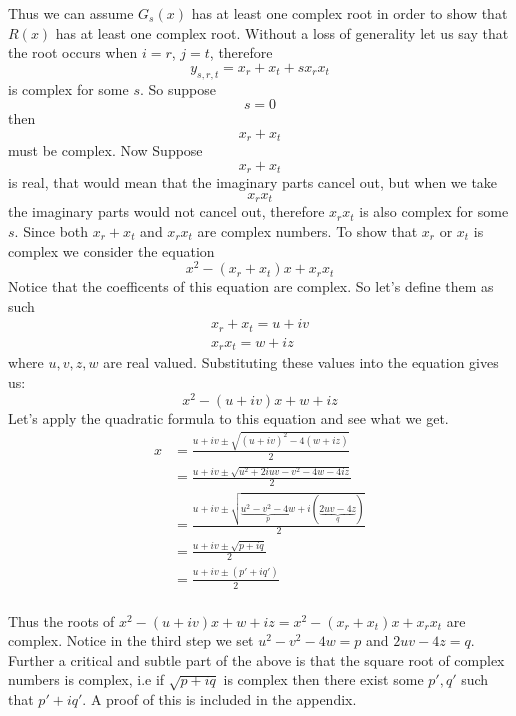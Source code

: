 \documentclass[12pt]{article}
\begin{document}
\begin{center}
\end{center}

  Thus we can assume $G_s(x)$ has at least one complex root in order to show that $R(x)$ has at least one complex root.  Without a loss of generality let us say that the root occurs when $i=r$, $j=t$, therefore 
$$y_{s,r,t} = x_r + x_t +s x_r x_t$$ 
is complex for some $s$.  So suppose 
$$s=0$$ 
then 
$$x_r + x_t$$ 
must be complex.  Now Suppose 
$$x_r + x_t$$ 
is real, that would mean that the imaginary parts cancel out, but when we take 
$$x_r x_t$$ 
the imaginary parts would not cancel out, therefore $x_r x_t$ is also complex for some $s$.  Since both $x_r+x_t$ and $x_r x_t$ are complex numbers.  To show that $x_r$ or $x_t$ is complex we consider the equation 
$$x^2 - (x_r +x_t)x + x_r x_t$$  Notice that the coefficents of this equation are complex.  So let's define them as such 
\begin{align*}
x_r + x_t = u + iv \\
x_r x_t = w +iz
\end{align*}
where $u,v,z,w$ are real valued.  Substituting these values into the equation gives us:
$$ x^2 -(u+iv)x + w +iz$$
Let's apply the quadratic formula to this equation and see what we get.
\begin{align*}
x &= \frac{u+iv \pm \sqrt{(u+iv)^2-4(w+iz)}}{2} \\
&= \frac{u+iv \pm \sqrt{u^2 +2iuv - v^2 - 4w - 4iz}}{2} \\
&= \frac{u+iv \pm \sqrt{\underbrace{u^2 - v^2 -4w}_p + i (\underbrace{2uv-4z}_q)}}{2}  \\
&= \frac{u+iv \pm \sqrt{p+iq}}{2} \\
&= \frac{u+ iv \pm (p' +iq')}{2} \\
\end{align*}

Thus the roots of $ x^2 -(u+iv)x + w +iz = x^2 - (x_r +x_t)x + x_r x_t$ are complex.  Notice in the third step we set $u^2 - v^2 -4w=p$ and $2uv-4z=q$.  Further a critical and subtle part of the above is that the square root of complex numbers is complex, i.e if $\sqrt{p+iq}$ is complex then there exist some $p', q'$ such that $p' +iq'$.  A proof of this is included in the appendix.\\
\end{document}
